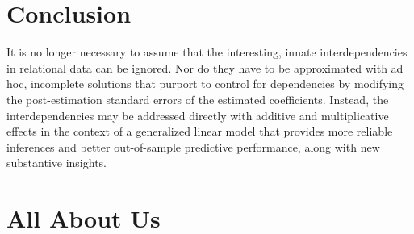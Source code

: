 \documentclass[12pt]{amsart}
\begin{document}
\section{Conclusion}

It is no longer necessary to assume that the interesting, innate interdependencies in relational data can be ignored. Nor do they have to be approximated with ad hoc, incomplete solutions that purport to control for dependencies by modifying the post-estimation standard errors of the estimated coefficients. Instead, the interdependencies may be addressed directly with additive and multiplicative effects in the context of a generalized linear model that provides more reliable inferences and better out-of-sample predictive performance, along with new substantive insights. 


\newpage
\clearpage
% 


\clearpage
\section*{All About Us}
\end{document}
